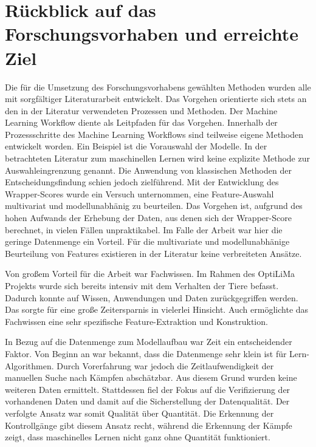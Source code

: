 \section{Rückblick auf das Forschungsvorhaben und erreichte Ziel}

Die für die Umsetzung des Forschungsvorhabens gewählten Methoden wurden alle mit sorgfältiger Literaturarbeit entwickelt. Das Vorgehen orientierte sich stets an den in der Literatur verwendeten Prozessen und Methoden. Der Machine Learning Workflow diente als Leitpfaden für das Vorgehen. Innerhalb der Prozessschritte des Machine Learning Workflows sind teilweise eigene Methoden entwickelt worden. Ein Beispiel ist die Vorauswahl der Modelle. In der betrachteten Literatur zum maschinellen Lernen wird keine explizite Methode zur Auswahleingrenzung genannt. Die Anwendung von klassischen Methoden der Entscheidungsfindung schien jedoch zielführend. Mit der Entwicklung des Wrapper-Scores wurde ein Versuch unternommen, eine Feature-Auswahl multivariat und modellunabhänig zu beurteilen. Das Vorgehen ist, aufgrund des hohen Aufwands der Erhebung der Daten, aus denen sich der Wrapper-Score berechnet, in vielen Fällen unpraktikabel. Im Falle der Arbeit war hier die geringe Datenmenge ein Vorteil. Für die  multivariate und modellunabhänige Beurteilung von Features existieren in der Literatur keine verbreiteten Ansätze. \par

Von großem Vorteil für die Arbeit war Fachwissen. Im Rahmen des \acrshort{OptiLiMa} Projekts wurde sich bereits intensiv mit dem Verhalten der Tiere befasst. Dadurch konnte auf Wissen, Anwendungen und Daten zurückgegriffen werden. Das sorgte für eine große Zeitersparnis in vielerlei Hinsicht. Auch ermöglichte das Fachwissen eine sehr spezifische Feature-Extraktion und Konstruktion. \par

In Bezug auf die Datenmenge zum Modellaufbau war Zeit ein entscheidender Faktor. Von Beginn an war bekannt, dass die Datenmenge sehr klein ist für Lern-Algorithmen. Durch Vorerfahrung war jedoch die Zeitlaufwendigkeit der manuellen Suche nach Kämpfen abschätzbar. Aus diesem Grund wurden keine weiteren Daten ermittelt. Stattdessen fiel der Fokus auf die Verifizierung der vorhandenen Daten und damit auf die Sicherstellung der Datenqualität. Der verfolgte Ansatz war somit Qualität über Quantität. Die Erkennung der Kontrollgänge gibt diesem Ansatz recht, während die Erkennung der Kämpfe zeigt, dass maschinelles Lernen nicht ganz ohne Quantität funktioniert. \par

